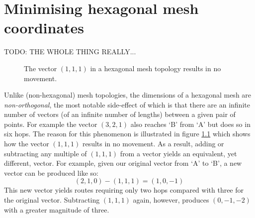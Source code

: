 \chapter{Minimising hexagonal mesh coordinates}
	\label{app:minimal-hex-coordinates}
	
	TODO: THE WHOLE THING REALLY...
	
	\begin{figure}
		\center
		\caption{The vector $(1, 1, 1)$ in a hexagonal mesh topology results in
		no movement.}
		\label{fig:hex-mesh-loop}
	\end{figure}
	
	Unlike (non-hexagonal) mesh topologies, the dimensions of a hexagonal
	mesh are \emph{non-orthogonal}, the most notable side-effect of which is
	that there are an infinite number of vectors (of an infinite number of
	lengths) between a given pair of points. For example the vector $(3, 2,
	1)$ also reaches `B' from `A' but does so in six hops. The reason for
	this phenomenon is illustrated in figure \ref{fig:hex-mesh-loop} which
	shows how the vector $(1, 1, 1)$ results in no movement. As a result,
	adding or subtracting any multiple of $(1, 1, 1)$ from a vector yields an
	equivalent, yet different, vector. For example, given our original vector
	from `A' to `B', a new vector can be produced like so:
	\begin{equation} (2, 1, 0) - (1, 1, 1) = (1, 0, -1) \end{equation}
	This new vector yields routes requiring only two hops compared with three
	for the original vector. Subtracting $(1, 1, 1)$ again, however, produces
	$(0, -1, -2)$ with a greater magnitude of three.
